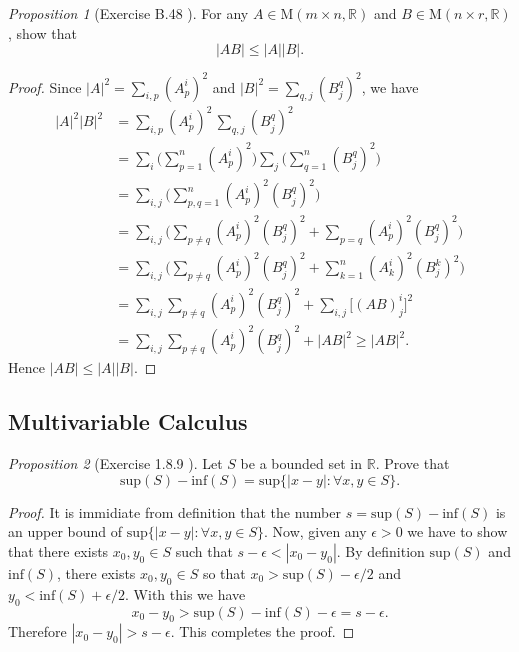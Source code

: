 \documentclass[a4paper]{article}
\theoremstyle{remark}
\newtheorem{prop}{Proposition}
\newcommand{\er}{\mathbb{R}} %
\begin{document}
\begin{prop}[Exercise B.48 \cite{LeeSM}]
For any $A \in \text{M}(m\times n, \er)$ and $B \in \text{M}(n\times r, \er)$, show that 
$$
|AB| \leq |A||B|.
$$
\end{prop}
\begin{proof}
Since $|A|^2 = \sum_{i,p} (A^i_p)^2$ and $|B|^2 = \sum_{q,j} (B^q_j)^2$, we have
\begin{align*}
|A|^2|B|^2 &=\sum_{i,p} (A^i_p)^2 \, \sum_{q,j} (B^q_j)^2 \\
&= \sum_i \Big(\sum_{p=1}^n (A^i_p)^2 \Big) \sum_{j} \Big( \sum_{q=1}^n (B^q_j)^2 \Big) \\
&= \sum_{i,j} \Big( \sum_{p,q=1}^n (A^i_p)^2(B^q_j)^2 \Big) \\
&= \sum_{i,j} \Big( \sum_{p\neq q} (A^i_p)^2(B^q_j)^2 + \sum_{p=q} (A^i_p)^2(B^q_j)^2 \Big) \\
&= \sum_{i,j} \Big( \sum_{p\neq q} (A^i_p)^2(B^q_j)^2 + \sum_{k=1}^n (A^i_k)^2(B^k_j)^2 \Big) \\
&= \sum_{i,j} \sum_{p\neq q} (A^i_p)^2(B^q_j)^2 + \sum_{i,j} \big[(AB)^i_j\big]^2 \\
&= \sum_{i,j} \sum_{p\neq q} (A^i_p)^2(B^q_j)^2 + |AB|^2 \geq |AB|^2.
\end{align*}
Hence $|AB| \leq |A||B|$.

\end{proof}

\subsection*{Multivariable Calculus}

\begin{prop}[Exercise 1.8.9 \cite{Moskowitz}] 
Let $S$ be a bounded set in $\er$. Prove that 
$$
\text{sup}(S) - \text{inf}(S) = \text{sup} \{ |x-y|: \forall x,y \in S \}.
$$
\end{prop}
\begin{proof}
It is immidiate from definition that the number  $s = \text{sup}(S) - \text{inf}(S)$ is an upper bound of $ \text{sup} \{ |x-y|: \forall x,y \in S \}$. Now, given any $\epsilon >0$ we have to show that there exists $x_0,y_0 \in S$ such that $s - \epsilon < |x_0-y_0|$. By definition $\text{sup}(S)$ and $\text{inf}(S)$, there exists $x_0,y_0 \in S$ so that $x_0 > \text{sup}(S) - \epsilon/2$ and $y_0 < \text{inf}(S) + \epsilon/2$. With this we have
$$
x_0-y_0 > \text{sup}(S) - \text{inf}(S) -\epsilon = s-\epsilon.
$$ 
Therefore $|x_0-y_0|> s-\epsilon$. This completes the proof.
\end{proof}
\end{document}
